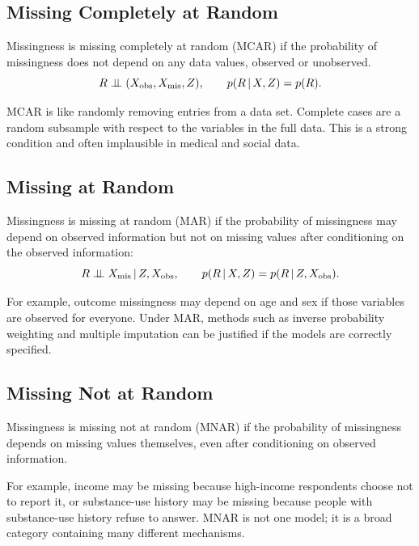 \label{lec:9-9}

\subsection{Missing Completely at Random}

\begin{definition}
Missingness is missing completely at random (MCAR) if the probability of
missingness does not depend on any data values, observed or unobserved.
\[
  R\perp\!\!\!\perp (X_{\mathrm{obs}},X_{\mathrm{mis}},Z),
  \qquad
  p(R\,\vert\, X,Z)=p(R).
\]
\end{definition}

MCAR is like randomly removing entries from a data set. Complete cases are a
random subsample with respect to the variables in the full data. This is a strong
condition and often implausible in medical and social data.

\subsection{Missing at Random}

\begin{definition}
Missingness is missing at random (MAR) if the probability of missingness may
depend on observed information but not on missing values after conditioning on
the observed information:
\[
  R\perp\!\!\!\perp X_{\mathrm{mis}}\,\vert\, Z,X_{\mathrm{obs}},
  \qquad
  p(R\,\vert\, X,Z)=p(R\,\vert\, Z,X_{\mathrm{obs}}).
\]
\end{definition}

For example, outcome missingness may depend on age and sex if those variables
are observed for everyone. Under MAR, methods such as inverse probability
weighting and multiple imputation can be justified if the models are correctly
specified.

\subsection{Missing Not at Random}

\begin{definition}
Missingness is missing not at random (MNAR) if the probability of missingness
depends on missing values themselves, even after conditioning on observed
information.
\end{definition}

For example, income may be missing because high-income respondents choose not
to report it, or substance-use history may be missing because people with
substance-use history refuse to answer. MNAR is not one model; it is a broad
category containing many different mechanisms.

